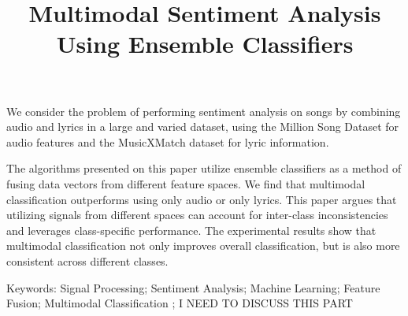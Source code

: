 \title{Multimodal Sentiment Analysis Using Ensemble Classifiers}

We consider the problem of performing sentiment analysis on songs
 by combining audio and lyrics in a large and varied dataset, 
 using the Million Song Dataset for audio features and the 
 MusicXMatch dataset for lyric information. 
 
 The algorithms presented on this paper utilize ensemble classifiers
  as a method of fusing data vectors from different feature spaces.  
  We find that multimodal classification outperforms using only audio 
  or only lyrics. This paper argues that utilizing signals from different 
  spaces can account for inter-class inconsistencies and leverages
   class-specific performance. The experimental results show that 
   multimodal classification not only improves overall classification, 
   but is also more consistent across different classes. 
 


Keywords: Signal Processing; Sentiment Analysis; Machine Learning; 
Feature Fusion; Multimodal Classification ; I NEED TO DISCUSS THIS PART
